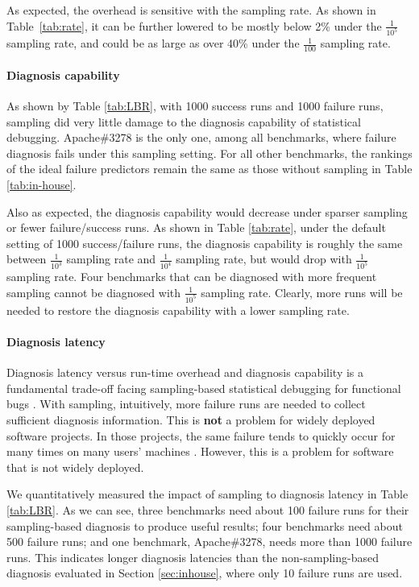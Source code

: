 As expected, the overhead is sensitive with the sampling rate. As shown in
Table~\ref{tab:rate}, it can be further lowered to be mostly below 2\% under
the $\frac{1}{10^{5}}$ sampling rate, and could be as large as over 40\% under
the $\frac{1}{100}$ sampling rate.


\paragraph{Diagnosis capability}
As shown by Table \ref{tab:LBR}, with 1000 success runs
and 1000 failure runs, sampling did very little damage to
the diagnosis capability of statistical debugging. 
Apache\#3278 is the only one, among all benchmarks, where 
failure diagnosis fails under this sampling setting.
For all other benchmarks, the
rankings of the ideal failure predictors remain the same as those 
without sampling in Table \ref{tab:in-house}.

Also as expected, the diagnosis capability would decrease under sparser
sampling or fewer failure/success runs. As shown in Table \ref{tab:rate},
under the default setting of 1000 success/failure runs, the diagnosis capability
is roughly the same between $\frac{1}{10^{3}}$ sampling rate and 
$\frac{1}{10^{4}}$ sampling
rate, but would drop with $\frac{1}{10^{5}}$ sampling rate. 
Four benchmarks that can be diagnosed 
with more frequent sampling cannot be diagnosed with
$\frac{1}{10^{5}}$ sampling rate.
Clearly, more
runs will be needed to restore the diagnosis capability with a lower
sampling rate.

\paragraph{Diagnosis latency}
Diagnosis latency versus run-time overhead and diagnosis capability 
is a fundamental trade-off facing
sampling-based statistical debugging for functional bugs \cite{liblit03,liblit05,CCI}.
With sampling, intuitively, more failure runs are needed
to collect sufficient diagnosis information. This is \textbf{not} a problem for widely
deployed software projects. In those projects, the same failure tends to quickly occur
for many times on many users' machines
\cite{hunt.sosp09}. However, this is a problem
for software that is not widely deployed.

We quantitatively measured the impact of sampling to diagnosis latency in 
Table \ref{tab:LBR}. As we can see, three benchmarks need about 100 failure
runs for their sampling-based diagnosis to produce useful results; 
four benchmarks need about 500 failure runs; and one benchmark, Apache\#3278, 
needs more than 1000 failure runs. This
indicates longer diagnosis latencies than the non-sampling-based diagnosis
evaluated in Section \ref{sec:inhouse}, where only 10 failure runs are used.

